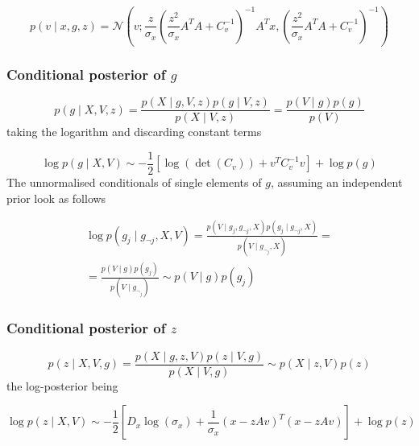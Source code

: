 \documentclass{paper}
\begin{document}
\begin{equation} \label{eq:condpost_v}
p(v \mid x,g,z) = \mathcal{N}\left(v; \frac{z}{ \sigma_x} \left( \frac{z^2}{ \sigma_x} A^T A + C_v^{-1}\right)^{-1} A^T x, \left(\frac{z^2}{\sigma_x} A^T A + C_v^{-1}\right)^{-1}\right)
\end{equation}


\subsubsection{Conditional posterior of $g$}

\begin{equation} 
p(g \mid X,V,z) = \frac{p(X \mid g,V,z) p(g \mid V,z)}{p(X \mid V,z)} = \frac{p(V \mid g) p(g)}{p(V)}
\end{equation}
%
taking the logarithm and discarding constant terms

\begin{equation} \label{eq:g_cond_logpost}
\log p(g \mid X,V) \sim -\frac{1}{2} \left[ \log(\det(C_v)) + v^T C_v^{-1} v\right] + \log p(g)
\end{equation}
%
The unnormalised conditionals of single elements of $g$, assuming an independent prior look as follows

\begin{equation} 
\begin{split}
\log p(g_j \mid g_{\neg j},X,V) = \frac{p(V \mid g_j,g_{\neg j},X) p(g_j \mid g_{\neg j},X)}{p(V \mid g_{\neg_j},X)} = \\
= \frac{ p(V \mid g) p(g_j) }{ p(V \mid g_{\neg_j}) } \sim p(V \mid g) p(g_j)
\end{split}
\end{equation}


\subsubsection{Conditional posterior of $z$}

\begin{equation} 
p(z \mid X,V,g) = \frac{p(X \mid g,z,V) p(z \mid V,g)}{p(X \mid V,g)} \sim p(X \mid z,V) p(z)
\end{equation}
% 
the log-posterior being

\begin{equation} \label{eq:z_cond_logpost}
\log p(z \mid X,V) \sim -\frac{1}{2} \left[ D_x\log(\sigma_x) + \frac{1}{\sigma_x} (x - zAv)^T (x - zAv)\right] + \log p(z)
\end{equation}
\end{document}
